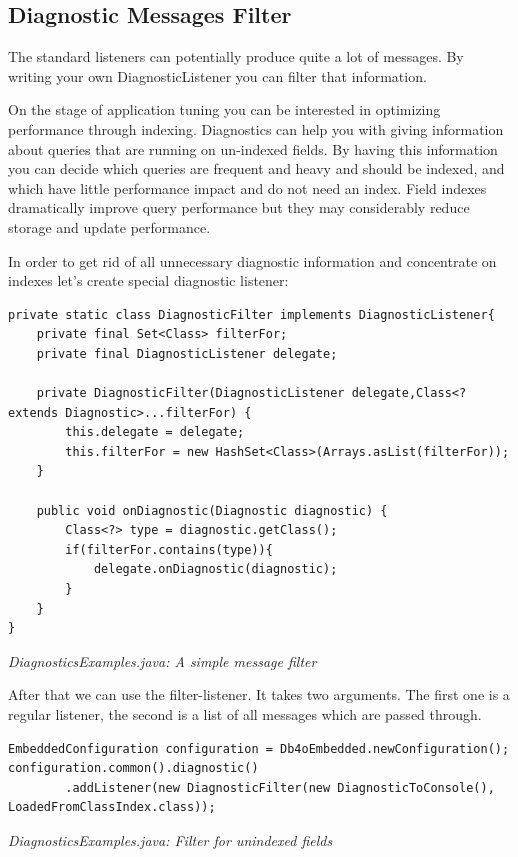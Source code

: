 \subsection{Diagnostic Messages Filter}
\label{ref:advanced-topics-diagnostics-diagnostic-messages-filter}

The standard listeners can potentially produce quite a lot of messages. By writing your own DiagnosticListener you can filter that information.

On the stage of application tuning you can be interested in optimizing performance through indexing. Diagnostics can help you with giving information about queries that are running on un-indexed fields. By having this information you can decide which queries are frequent and heavy and should be indexed, and which have little performance impact and do not need an index. Field indexes dramatically improve query performance but they may considerably reduce storage and update performance.

In order to get rid of all unnecessary diagnostic information and concentrate on indexes let's create special diagnostic listener:

\begin{lstlisting}
private static class DiagnosticFilter implements DiagnosticListener{
    private final Set<Class> filterFor;
    private final DiagnosticListener delegate;

    private DiagnosticFilter(DiagnosticListener delegate,Class<? extends Diagnostic>...filterFor) {
        this.delegate = delegate;
        this.filterFor = new HashSet<Class>(Arrays.asList(filterFor));
    }

    public void onDiagnostic(Diagnostic diagnostic) {
        Class<?> type = diagnostic.getClass();
        if(filterFor.contains(type)){
            delegate.onDiagnostic(diagnostic);
        }
    }
}
\end{lstlisting}

{\small\itshape DiagnosticsExamples.java: A simple message filter\par}
\medskip

After that we can use the filter-listener. It takes two arguments. The first one is a regular listener, the second is a list of all messages which are passed through.

\begin{lstlisting}
EmbeddedConfiguration configuration = Db4oEmbedded.newConfiguration();
configuration.common().diagnostic()
        .addListener(new DiagnosticFilter(new DiagnosticToConsole(), LoadedFromClassIndex.class));
\end{lstlisting}

{\small\itshape DiagnosticsExamples.java: Filter for unindexed fields\par}
\medskip

